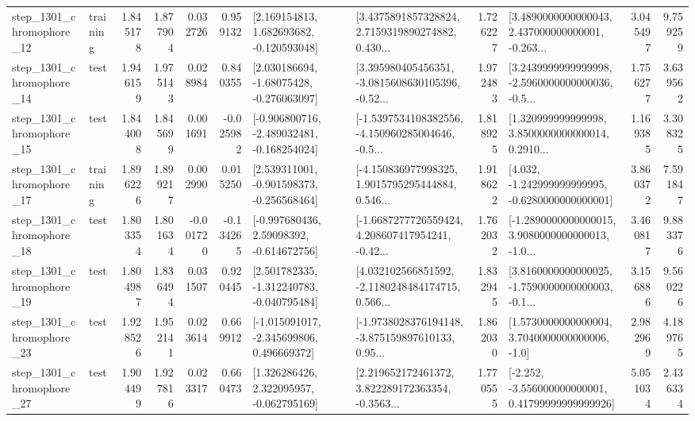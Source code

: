 \begin{tabular}{llrrrrllrlrr}
 step\_1301\_chromophore\_12 &  training &      1.845178 &    1.877904 &      0.032726 &  0.959132 &    [2.169154813, 1.682693682, -0.120593048] &  [3.4375891857328824, 2.7159319890274882, 0.430... &       1.726227 &  [3.4890000000000043, 2.437000000000001, -0.263... &            3.045497 &          9.759259 \\
 step\_1301\_chromophore\_14 &      test &      1.946159 &    1.975143 &      0.028984 &  0.840355 &    [2.030186694, -1.68075428, -0.276063097] &  [3.395980405456351, -3.0815608630105396, -0.52... &       1.972483 &  [3.2439999999999998, -2.5960000000000036, -0.5... &            1.756277 &          3.639562 \\
 step\_1301\_chromophore\_15 &      test &      1.844008 &    1.845699 &      0.001691 & -0.025982 &  [-0.906800716, -2.489032481, -0.168254024] &  [-1.5397534108382556, -4.150960285004646, -0.5... &       1.818925 &  [1.320999999999998, 3.8500000000000014, 0.2910... &            1.169385 &          3.308325 \\
 step\_1301\_chromophore\_17 &  training &      1.896226 &    1.899217 &      0.002990 &  0.015250 &   [2.539311001, -0.901598373, -0.256568464] &  [-4.150836977998325, 1.9015795295444884, 0.546... &       1.918622 &   [4.032, -1.242999999999995, -0.6280000000000001] &            3.860372 &          7.591847 \\
 step\_1301\_chromophore\_18 &      test &      1.803354 &    1.801634 &     -0.001720 & -0.134265 &    [-0.997680436, 2.59098392, -0.614672756] &  [-1.6687277726559424, 4.208607417954241, -0.42... &       1.762032 &  [-1.2890000000000015, 3.9080000000000013, -1.0... &            3.460817 &          9.883376 \\
 step\_1301\_chromophore\_19 &      test &      1.804987 &    1.836494 &      0.031507 &  0.920445 &   [2.501782335, -1.312240783, -0.040795484] &  [4.032102566851592, -2.1180248484174715, 0.566... &       1.832945 &  [3.8160000000000025, -1.7590000000000003, -0.1... &            3.156886 &          9.560226 \\
 step\_1301\_chromophore\_23 &      test &      1.928526 &    1.952141 &      0.023614 &  0.669912 &   [-1.015091017, -2.345699806, 0.496669372] &  [-1.9738028376194148, -3.875159897610133, 0.95... &       1.862030 &     [1.5730000000000004, 3.7040000000000006, -1.0] &            2.982969 &          4.189765 \\
 step\_1301\_chromophore\_27 &      test &      1.904499 &    1.927816 &      0.023317 &  0.660473 &    [1.326286426, 2.322095957, -0.062795169] &  [2.219652172461372, 3.822289172363354, -0.3563... &       1.770555 &  [-2.252, -3.556000000000001, 0.41799999999999926] &            5.051034 &          2.436334 \\

\end{tabular}
